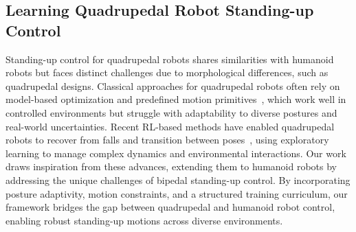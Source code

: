 \subsection{Learning Quadrupedal Robot Standing-up Control}
Standing-up control for quadrupedal robots shares similarities with humanoid robots but faces distinct challenges due to morphological differences, such as quadrupedal designs. Classical approaches for quadrupedal robots often rely on model-based optimization and predefined motion primitives~\cite{castano2019design,saranli2004model}, which work well in controlled environments but struggle with adaptability to diverse postures and real-world uncertainties. Recent RL-based methods have enabled quadrupedal robots to recover from falls and transition between poses~\cite{lee2019robust,ma2023learning,yang2023learning}, using exploratory learning to manage complex dynamics and environmental interactions. Our work draws inspiration from these advances, extending them to humanoid robots by addressing the unique challenges of bipedal standing-up control. By incorporating posture adaptivity, motion constraints, and a structured training curriculum, our framework bridges the gap between quadrupedal and humanoid robot control, enabling robust standing-up motions across diverse environments.
